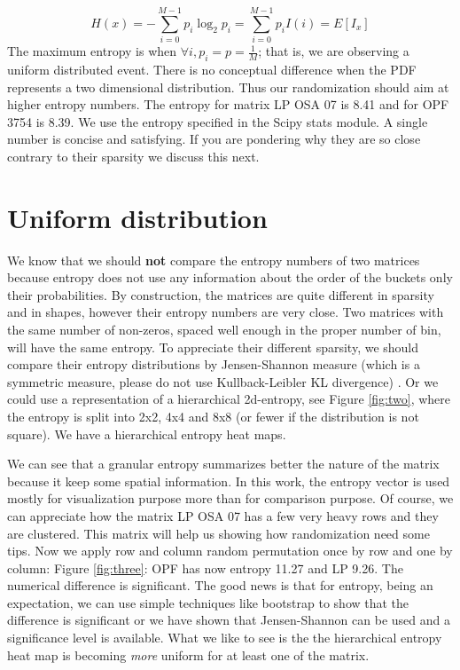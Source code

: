 \documentclass[manuscript,screen]{acmart}
\begin{document}
\begin{equation}
  \label{eq:entropy}
  H(x) = -\sum_{i=0}^{M-1} p_i\log_2p_i = \sum_{i=0}^{M-1}p_i I(i) =
  E[I_x]
\end{equation}
The maximum entropy is when $\forall i, p_i = p = \frac{1}{M}$; that
is, we are observing a uniform distributed event. There is no
conceptual difference when the PDF represents a two dimensional
distribution. Thus our randomization should aim at higher entropy
numbers. The entropy for matrix LP OSA 07 is 8.41 and for OPF 3754 is
8.39. We use the entropy specified in the Scipy stats module.  A
single number is concise and satisfying. If you are pondering why they
are so close contrary to their sparsity we discuss this next.


\section{Uniform distribution}
\label{sec:uniform}
We know that we should {\bf not} compare the entropy numbers of two
matrices because entropy does not use any information about the order
of the buckets only their probabilities. By construction, the matrices
are quite different in sparsity and in shapes, however their entropy
numbers are very close.  Two matrices with the same number of
non-zeros, spaced well enough in the proper number of bin, will have
the same entropy. To appreciate their different sparsity, we should
compare their entropy distributions by Jensen-Shannon measure (which
is a symmetric measure, please do not use Kullback-Leibler KL
divergence) \cite{dalberto2012nonparametric}. Or we could use a representation of a hierarchical
2d-entropy, see Figure \ref{fig:two}, where the entropy is split into
2x2, 4x4 and 8x8 (or fewer if the distribution is not square). We have
a hierarchical entropy heat maps.


We can see that a granular entropy summarizes better the nature of the
matrix because it keep some spatial information. In this work, the
entropy vector is used mostly for visualization purpose more than for
comparison purpose. Of course, we can appreciate how the matrix LP OSA
07 has a few very heavy rows and they are clustered. This matrix will
help us showing how randomization need some tips. Now we apply row and
column random permutation once by row and one by column: Figure
\ref{fig:three}: OPF has now entropy 11.27 and LP 9.26. The numerical
difference is significant. The good news is that for entropy, being an
expectation, we can use simple techniques like bootstrap to show that
the difference is significant or we have shown that Jensen-Shannon can
be used and a significance level is available. What we like to see is
the the hierarchical entropy heat map is becoming {\em more} uniform
for at least one of the matrix.
\end{document}
